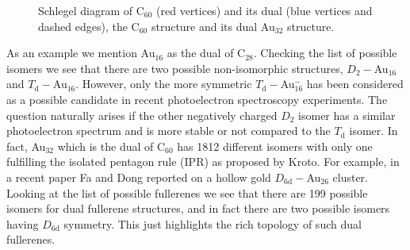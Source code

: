 \begin{figure}[htb]
\begin{center}
    \hspace{0.05\textwidth}
    \hspace{0.034\textwidth}
    \caption{\protect{} Schlegel diagram of C$_{60}$ (red
    vertices) and its dual (blue vertices and dashed edges),
    \protect{} the C$_{60}$ structure and
    \protect{} its dual Au$_{32}$ structure.}
\label{fig:C60dual}
\end{center}
\end{figure}

As an example we mention Au$_{16}$ as the dual of C$_{28}$. Checking the list
of possible isomers\autocite{Brinkmann_HouseGraphsdatabase_2013} we see that
there are two possible non-isomorphic structures, $D_2-$Au$_{16}$ and
$T_\mathrm{d}-$Au$_{16}$. However, only the more symmetric $T_\mathrm{d}-$Au$_{16}^-$ has been
considered as a possible candidate in recent photoelectron spectroscopy
experiments.\autocite{Bulusu_Evidencehollowgolden_2006} The question naturally
arises if the other negatively charged $D_\mathrm{2}$ isomer has a similar photoelectron
spectrum and is more stable or not compared to the $T_\mathrm{d}$ isomer. In fact,
Au$_{32}$ which is the dual of C$_{60}$ has 1812 different isomers with only
one fulfilling the isolated pentagon rule (IPR) as proposed by
Kroto.\autocite{Kroto_stabilityfullerenesCn_1987} For example, in a recent
paper Fa and Dong reported on a hollow gold $D_\mathrm{6d}-$Au$_{26}$
cluster.\autocite{Fa-Dong-2006,Fa-Luong-2008} Looking at the list of possible
fullerenes we see that there are 199 possible isomers for dual fullerene
structures, and in fact there are two possible isomers having $D_\mathrm{6d}$
symmetry. This just highlights the rich topology of such dual fullerenes.

